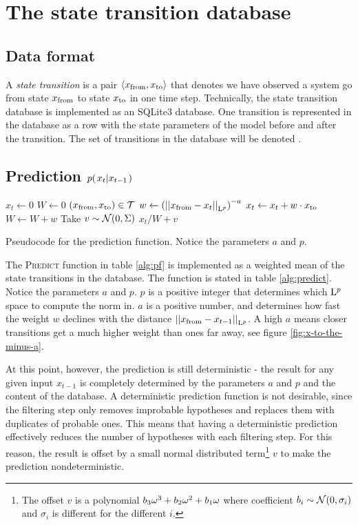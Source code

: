 \section{The state transition database}

\subsection{Data format}
A \emph{state transition} is a pair $\trans$ that denotes we have
observed a system go from state $\tf$ to state $\tt$ in one time
step. Technically, the state transition database is implemented as an
SQLite3 database. One transition is represented in the database as a
row with the state parameters of the model before and after the
transition. The set of transitions in the database will be denoted \TS.

\subsection{Prediction $\cprobnext{x}$}

\begin{table}[h]
  \begin{codebox}
    \li $ x_t \gets 0$
    \li $ W \gets 0$
    \li \ForEach $(\tf, \tt) \in \TS$
    \li \Do
      \li $ w \gets \left(\Lpnorm[p]{\tf - x_t}\right)^{-a}$
      \li $ x_t \gets x_t + w \cdot \tt$
      \li $ W \gets W + w$
    \End
    \li Take $v \sim \ndist{0}{\Sigma}$
    \li \Return $ x_t / W + v $
  \end{codebox}
  \caption{Pseudocode for the prediction function. Notice the parameters $a$ and $p$.}
  \label{alg:predict}
\end{table}

The \textsc{Predict} function in table \ref{alg:pf} is implemented as
a weighted mean of the state transitions in the database. The function
is stated in table \ref{alg:predict}. Notice the parameters $a$ and
$p$. $p$ is a positive integer that determines which $\Lp$ space to
compute the norm in. $a$ is a positive number, and determines how fast
the weight $w$ declines with the distance $\Lpnorm[p]{\tf -
  x_{t-1}}$. A high $a$ means closer transitions get a much higher
weight than ones far away, see figure \ref{fig:x-to-the-minus-a}.

At this point, however, the prediction is still deterministic - the
result for any given input $x_{t-1}$ is completely determined by the
parameters $a$ and $p$ and the content of the database. A
deterministic prediction function is not desirable, since the
filtering step only removes improbable hypotheses and replaces them
with duplicates of probable ones. This means that having a
deterministic prediction effectively reduces the number of hypotheses
with each filtering step. For this reason, the result is offset by a
small normal distributed term\footnote{The offset $v$ is a polynomial
  $\Spline[b]{\omega}$ where coefficient $b_i \sim \ndist{0}{\sigma_i}
  $ and $\sigma_i$ is different for the different $i$.} $v$ to make
the prediction nondeterministic.

